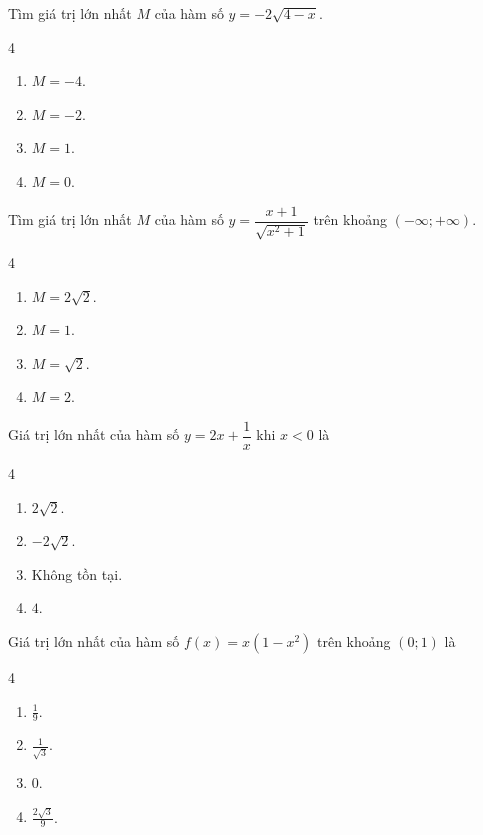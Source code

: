 \begin{baitap}
	Tìm giá trị lớn nhất $M$ của hàm số $y = -2\sqrt{4 - x}$.
	\begin{multicols}{4}
		\begin{enumerate}[\quad \bf A.]
			\item $M = -4$.
			\item $M = -2$.
			\item $M = 1$.
			\item $M = 0$.
		\end{enumerate}
	\end{multicols}
\end{baitap}

\begin{baitap}
	Tìm giá trị lớn nhất $M$ của hàm số $y = \dfrac{x + 1}{\sqrt{x^2 + 1}}$ trên khoảng $(-\infty; +\infty)$.
	\begin{multicols}{4}
		\begin{enumerate}[\quad \bf A.]
			\item $M = 2\sqrt{2}$.
			\item $M = 1$.
			\item $M = \sqrt{2}$.
			\item $M = 2$.
		\end{enumerate}
	\end{multicols}
\end{baitap}

\begin{baitap}
	Giá trị lớn nhất của hàm số $y = 2x + \dfrac{1}{x}$ khi $x < 0$ là
	\begin{multicols}{4}
		\begin{enumerate}[\quad \bf A.]
			\item $2\sqrt{2}$.
			\item $-2\sqrt{2}$.
			\item Không tồn tại.
			\item $4$.
		\end{enumerate}
	\end{multicols}
\end{baitap}
\begin{baitap}
	Giá trị lớn nhất của hàm số $f(x) = x(1 - x^2)$ trên khoảng $(0; 1)$ là
	\begin{multicols}{4}
		\begin{enumerate}[\quad \bf A.]
			\item $\frac{1}{9}$.
			\item $\frac{1}{\sqrt{3}}$.
			\item $0$.
			\item $\frac{2\sqrt{3}}{9}$.
		\end{enumerate}
	\end{multicols}
\end{baitap}

